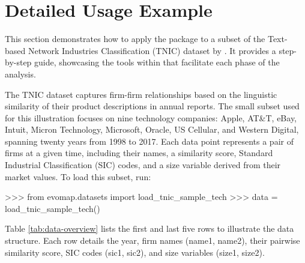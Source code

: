 \documentclass[article]{jss}
\begin{document}

\section{Detailed Usage Example} \label{sec:usage-example}

This section demonstrates how to apply the  package to a subset 
of the Text-based Network Industries Classification (TNIC) dataset by \cite{Hoberg+Phillips:2016}. 
It provides a step-by-step guide, showcasing the tools within  that facilitate 
each phase of the analysis. 

The TNIC dataset captures firm-firm relationships based on the linguistic similarity of their product descriptions 
in annual reports. The small subset used for this illustration focuses on nine technology companies: 
Apple, AT\&T, eBay, Intuit, Micron Technology, Microsoft, Oracle, US Cellular, and Western Digital, 
spanning twenty years from 1998 to 2017. Each data point represents a pair of firms at a given time, 
including their names, a similarity score, Standard Industrial Classification (SIC) codes, 
and a size variable derived from their market values. To load this subset, run:

\begin{Code}
>>> from evomap.datasets import load_tnic_sample_tech
>>> data = load_tnic_sample_tech()
\end{Code}

Table \ref{tab:data-overview} lists the first and last five rows to illustrate the data structure. 
Each row details the year, firm names (name1, name2), their pairwise similarity score, SIC codes (sic1, sic2), and size
 variables (size1, size2).
\end{document}
